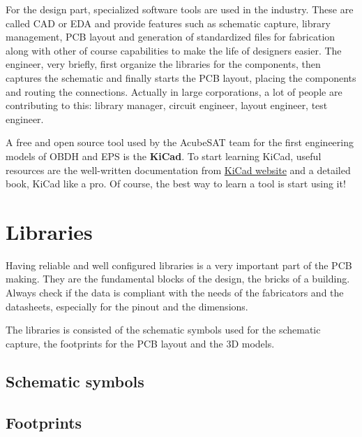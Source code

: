 \documentclass[final]{cubedoc}
\begin{document}
	For the design part, specialized software tools are used in the industry. These are called CAD or EDA and provide features such as schematic capture, library management, PCB layout and generation of standardized files for fabrication along with other of course capabilities to make the life of designers easier. The engineer, very briefly, first organize the libraries for the components, then captures the schematic and finally starts the PCB layout, placing the components and routing the connections. Actually in large corporations, a lot of people are contributing to this: library manager, circuit engineer, layout engineer, test engineer.
	
	A free and open source tool used by the AcubeSAT team for the first engineering models of OBDH and EPS is the \textbf{KiCad}. To start learning KiCad, useful resources are the well-written documentation from \href{http://docs.kicad-pcb.org/}{KiCad website} and a detailed book, KiCad like a pro. Of course, the best way to learn a tool is start using it!
	
	\section{Libraries}
	
	Having reliable and well configured libraries is a very important part of the PCB making. They are the fundamental blocks of the design, the bricks of a building. Always check if the data is compliant with the needs of the fabricators and the datasheets, especially for the pinout and the dimensions.
	
	The libraries is consisted of the schematic symbols used for the schematic capture, the footprints for the PCB layout and the 3D models.
	
	\subsection{Schematic symbols}
	
	\subsection{Footprints}
	
\end{document}
